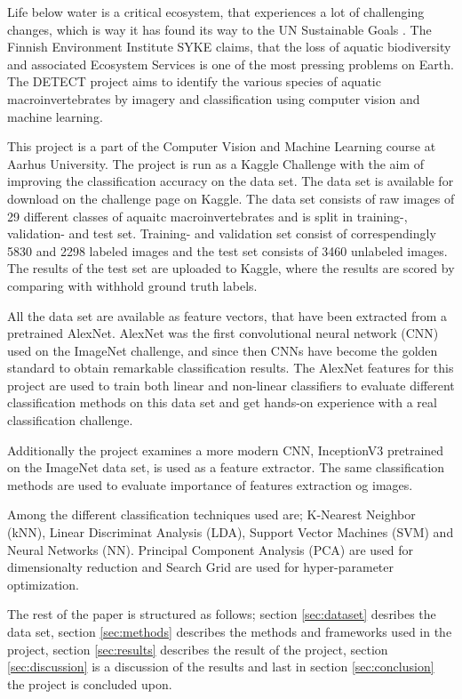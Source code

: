 Life below water is a critical ecosystem, that experiences a lot of challenging changes, which is way it has found its way to the UN Sustainable Goals \cite{UN}. The Finnish Environment Institute \cite{meissner} SYKE claims, that the loss of aquatic biodiversity and associated Ecosystem Services is one of the most pressing problems on Earth. The DETECT project aims to identify the various species of aquatic macroinvertebrates by imagery and classification using computer vision and machine learning. 

This project is a part of the Computer Vision and Machine Learning course at Aarhus University. The project is run as a Kaggle Challenge with the aim of improving the classification accuracy on the data set. The data set is available for download on the challenge page on Kaggle. The data set consists of raw images of 29 different classes of aquaitc macroinvertebrates and is split in training-, validation- and test set. Training- and validation set consist of correspendingly 5830 and 2298 labeled images and the test set consists of 3460 unlabeled images. The results of the test set are uploaded to Kaggle, where the results are scored by comparing with withhold ground truth labels. 

All the data set are available as feature vectors, that have been extracted from a pretrained AlexNet. AlexNet \cite{Krizhevsky:2012} was the first convolutional neural network (CNN) used on the ImageNet challenge, and since then CNNs have become the golden standard to obtain remarkable classification results. The AlexNet features for this project are used to train both linear and non-linear classifiers to evaluate different classification methods on this data set and get hands-on experience with a real classification challenge. 

Additionally the project examines a more modern CNN, InceptionV3 \cite{inception} pretrained on the ImageNet data set, is used as a feature extractor. The same classification methods are used to evaluate importance of features extraction og images. 

Among the different classification techniques used are; K-Nearest Neighbor (kNN), Linear Discriminat Analysis (LDA), Support Vector Machines (SVM) and Neural Networks (NN). Principal Component Analysis (PCA) are used for dimensionalty reduction and Search Grid are used for hyper-parameter optimization.

The rest of the paper is structured as follows; section \ref{sec:dataset} desribes the data set, section \ref{sec:methods} describes the methods and frameworks used in the project, section \ref{sec:results} describes the result of the project, section \ref{sec:discussion} is a discussion of the results and last in section \ref{sec:conclusion} the project is concluded upon.